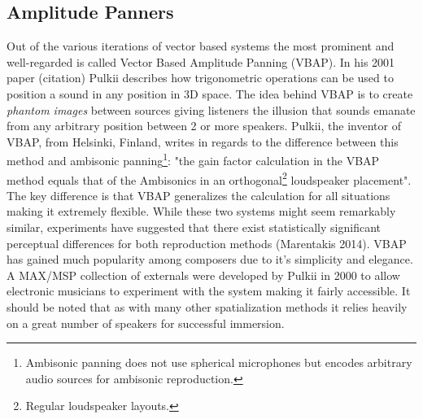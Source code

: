 \subsection{Amplitude Panners}
\label{subsec:amplitude panner}


Out of the various iterations of vector based systems the most prominent and well-regarded is called Vector Based Amplitude Panning (VBAP). In his 2001 paper (citation) Pulkii describes how trigonometric operations can be used to position a sound in any position in 3D space. The idea behind VBAP is to create \textit{phantom images} between sources giving listeners the illusion that sounds emanate from any arbitrary position between 2 or more speakers. Pulkii, the inventor of VBAP, from Helsinki, Finland, writes in regards to the difference between this method and ambisonic panning\footnote{Ambisonic panning does not use spherical microphones but encodes arbitrary audio sources for ambisonic reproduction.}: "the gain factor calculation in the VBAP method equals that of the Ambisonics in an orthogonal\footnote{Regular loudspeaker layouts.} loudspeaker placement". The key difference is that VBAP generalizes the calculation for all situations making it extremely flexible. While these two systems might seem remarkably similar, experiments have suggested that there exist statistically significant perceptual differences for both reproduction methods (Marentakis 2014). VBAP has gained much popularity among composers due to it's simplicity and elegance. A MAX/MSP collection of externals were developed by Pulkii in 2000 to allow electronic musicians to experiment with the system making it fairly accessible. It should be noted that as with many other spatialization methods it relies heavily on a great number of speakers for successful immersion. 



